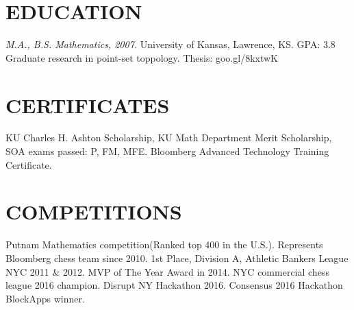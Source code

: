 \documentclass[margin]{res}
\begin{document}
\begin{resume}
\section{EDUCATION} 
		{\sl M.A., B.S. Mathematics, 2007. } University of Kansas, Lawrence, KS. GPA: 3.8  \\
		    Graduate research in point-set toppology. Thesis: goo.gl/8kxtwK
\section{CERTIFICATES} 
            KU Charles H. Ashton Scholarship, KU Math Department Merit Scholarship, SOA exams passed: P, FM, MFE. Bloomberg Advanced Technology Training Certificate. 
\section{COMPETITIONS}
         Putnam Mathematics competition(Ranked top 400 in the U.S.). Represents Bloomberg chess team since 2010. 1st Place, Division A, Athletic Bankers League NYC 2011 \& 2012. MVP of The Year Award in 2014. NYC commercial chess league 2016 champion. Disrupt NY Hackathon 2016. Consensus 2016 Hackathon BlockApps winner.
\end{resume}
\end{document}
